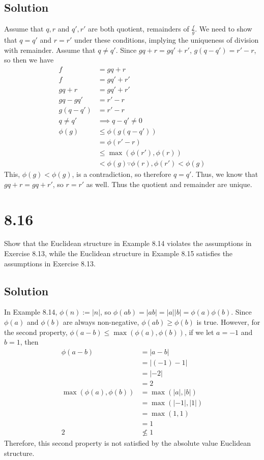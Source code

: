 \documentclass[fleqn]{article}
\begin{document}
        \subsection{Solution}
        Assume that $q, r$ and $q', r'$ are both quotient, remainders of $\frac{f}{g}$.  We need to show that $q = q'$ and $r = r'$ under these conditions, implying the uniqueness of division with remainder.  Assume that $q \neq q'$.  Since $gq + r = gq' + r'$, $g(q - q') = r' - r$, so then we have
        \begin{align}
            f &= gq + r \\
            f &= gq' + r' \\
            gq + r &= gq' + r' \\
            gq - gq' &= r' - r \\
            g(q - q') &= r' - r \\
            q \neq q' &\implies q - q' \neq 0 \\
            \phi(g) &\leq \phi(g(q - q')) \\
                &= \phi(r' - r) \\
                &\leq \max(\phi(r'), \phi(r)) \\
                &< \phi(g) \because{} \phi(r), \phi(r') < \phi(g)
        \end{align}
        This, $\phi(g) < \phi(g)$, is a contradiction, so therefore $q = q'$.  Thus, we know that $gq + r = gq + r'$, so $r = r'$ as well.  Thus the quotient and remainder are unique.
    
    \section{8.16}
    Show that the Euclidean structure in Example 8.14 violates the assumptions in Exercise 8.13, while the Euclidean structure in Example 8.15 satisfies the assumptions in Exercise 8.13.
        
        \subsection{Solution}
        In Example 8.14, $\phi(n) := |n|$, so $\phi(ab) = |ab| = |a||b| = \phi(a)\phi(b)$.  Since $\phi(a)$ and $\phi(b)$ are always non-negative, $\phi(ab) \geq \phi(b)$ is true.  However, for the second property, $\phi(a - b) \leq \max(\phi(a), \phi(b))$, if we let $a = -1$ and $b = 1$, then
        \begin{align}
            \phi(a - b) &= |a - b| \\
                &= |(-1) - 1| \\
                &= |-2| \\
                &= 2 \\
            \max(\phi(a), \phi(b)) &= \max(|a|, |b|) \\
                &= \max(|-1|, |1|) \\
                &= \max(1, 1) \\
                &= 1 \\
            2 &\not\leq 1
        \end{align}
        Therefore, this second property is not satisfied by the absolute value Euclidean structure.
        
\end{document}
